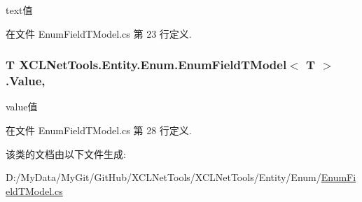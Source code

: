 text值 



在文件 Enum\-Field\-T\-Model.\-cs 第 23 行定义.

\hypertarget{class_x_c_l_net_tools_1_1_entity_1_1_enum_1_1_enum_field_t_model_3_01_t_01_4_a0b6e9efa5eb3b809fdc2bbb675a4e8e3}{
\subsubsection[{Value}]{\setlength{\rightskip}{0pt plus 5cm}T X\-C\-L\-Net\-Tools.\-Entity.\-Enum.\-Enum\-Field\-T\-Model$<$ T $>$.Value\hspace{0.3cm}{\ttfamily [get]}, {\ttfamily [set]}}}\label{class_x_c_l_net_tools_1_1_entity_1_1_enum_1_1_enum_field_t_model_3_01_t_01_4_a0b6e9efa5eb3b809fdc2bbb675a4e8e3}


value值 



在文件 Enum\-Field\-T\-Model.\-cs 第 28 行定义.



该类的文档由以下文件生成\-:\begin{DoxyCompactItemize}
\item 
D\-:/\-My\-Data/\-My\-Git/\-Git\-Hub/\-X\-C\-L\-Net\-Tools/\-X\-C\-L\-Net\-Tools/\-Entity/\-Enum/\hyperlink{_enum_field_t_model_8cs}{Enum\-Field\-T\-Model.\-cs}\end{DoxyCompactItemize}
